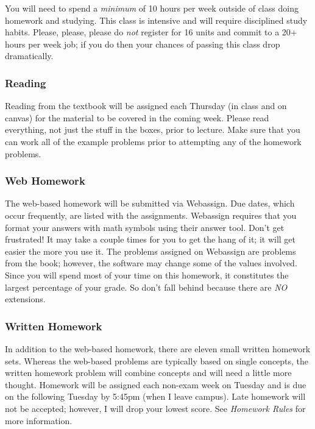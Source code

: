 \documentclass[letterpaper,12pt,fleqn]{article}
\begin{document}
You will need to spend a \emph{minimum} of 10 hours per week outside of class doing homework and studying. This class is
intensive and will require disciplined study habits.  Please, please, please do \emph{not} register for 16 units and commit
to a 20+ hours per week job; if you do then your chances of passing this class drop dramatically.

\subsubsection*{Reading}

Reading from the textbook will be assigned each Thursday (in class and on canvas) for the material to be
covered in the coming week.  Please read everything, not just the stuff in the boxes, prior to lecture.  Make sure that you
can work all of the example problems prior to attempting any of the homework problems.

\subsubsection*{Web Homework}

The web-based homework will be submitted via Webassign.  Due dates, which occur frequently, are listed with the assignments.
Webassign requires that you format your answers with math symbols using their answer tool.  Don't get frustrated!  It may
take a couple times for you to get the hang of it; it will get easier the more you use it.  The problems assigned on
Webassign are problems from the book; however, the software may change some of the values involved.  Since you will spend
most of your time on this homework, it constitutes the largest percentage of your grade.  So don't fall behind because there
are \emph{NO} extensions.

\subsubsection*{Written Homework}

In addition to the web-based homework, there are eleven small written homework sets.  Whereas the web-based problems are
typically based on single concepts, the written homework problem will combine concepts and will need a little more thought.
Homework will be assigned each non-exam week on Tuesday and is due on the following Tuesday by 5:45pm (when I leave campus).
Late homework will not be accepted; however, I will drop your lowest score.  See \emph{Homework Rules} for more information.
\end{document}
